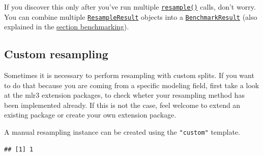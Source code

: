 \documentclass[]{scrbook}
\newenvironment{Shaded}{\begin{snugshade}}{\end{snugshade}}
\newcommand{\DataTypeTok}[1]{\textcolor[rgb]{0.13,0.29,0.53}{#1}}
\newcommand{\DecValTok}[1]{\textcolor[rgb]{0.00,0.00,0.81}{#1}}
\newcommand{\KeywordTok}[1]{\textcolor[rgb]{0.13,0.29,0.53}{\textbf{#1}}}
\newcommand{\NormalTok}[1]{#1}
\newcommand{\OperatorTok}[1]{\textcolor[rgb]{0.81,0.36,0.00}{\textbf{#1}}}
\newcommand{\StringTok}[1]{\textcolor[rgb]{0.31,0.60,0.02}{#1}}
\renewenvironment{Shaded} {\begin{snugshade}\small} {\end{snugshade}}
\begin{document}
If you discover this only after you've run multiple \href{https://mlr3.mlr-org.com/reference/resample.html}{\texttt{resample()}} calls, don't worry.
You can combine multiple \href{https://mlr3.mlr-org.com/reference/ResampleResult.html}{\texttt{ResampleResult}} objects into a \href{https://mlr3.mlr-org.com/reference/BenchmarkResult.html}{\texttt{BenchmarkResult}} (also explained in the \protect\hyperlink{benchmarking}{section benchmarking}).

\hypertarget{resamp-custom}{%
\subsection{Custom resampling}\label{resamp-custom}}

Sometimes it is necessary to perform resampling with custom splits.
If you want to do that because you are coming from a specific modeling field, first take a look at the mlr3 extension packages, to check wheter your resampling method has been implemented already.
If this is not the case, feel welcome to extend an existing package or create your own extension package.

A manual resampling instance can be created using the \texttt{"custom"} template.

\begin{Shaded}
\end{Shaded}

\begin{verbatim}
## [1] 1
\end{verbatim}

\begin{Shaded}
\end{Shaded}
\end{document}
